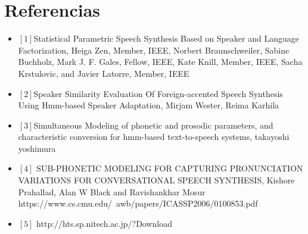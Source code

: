 \section{Referencias}
\begin{itemize}
\item $[1]$Statistical Parametric Speech Synthesis Based on Speaker and Language Factorization, Heiga Zen, Member, IEEE, Norbert Braunschweiler, Sabine Buchholz, Mark J. F. Gales, Fellow, IEEE, Kate Knill, Member, IEEE, Sacha Krstulovic, and Javier Latorre, Member, IEEE
\item $[2]$Speaker Similarity Evaluation Of Foreign-accented Speech Synthesis Using Hmm-based Speaker Adaptation, Mirjam Wester, Reima Karhila
\item $[3]$Simultaneous Modeling of phonetic and prosodic parameters, and characteristic conversion for hmm-based text-to-speech systems, takayoshi yoshimura
\item $[4]$ SUB-PHONETIC MODELING FOR CAPTURING PRONUNCIATION VARIATIONS FOR CONVERSATIONAL SPEECH SYNTHESIS, Kishore Prahallad, Alan W Black and Ravishankhar Mosur https://www.cs.cmu.edu/~awb/papers/ICASSP2006/0100853.pdf
\item $[5]$ http://hts.sp.nitech.ac.jp/?Download
\end{itemize}